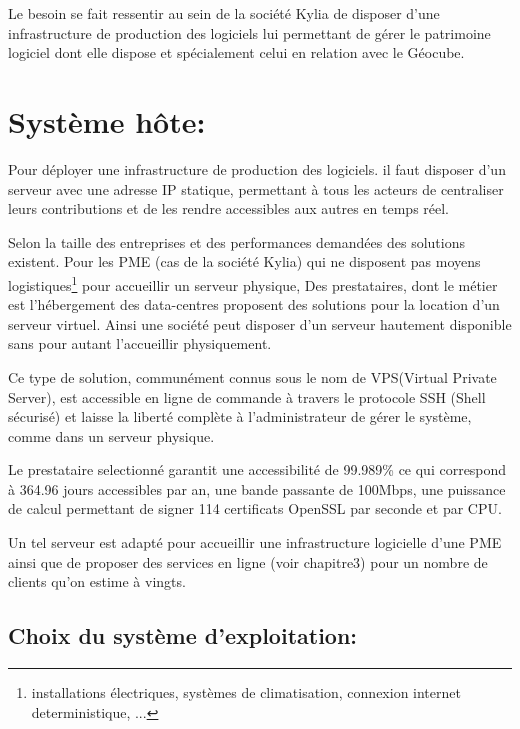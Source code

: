 \documentclass{themeensg}
\begin{document}

Le besoin se fait ressentir au sein de la société Kylia de disposer d'une infrastructure de production des logiciels lui permettant de gérer le patrimoine logiciel dont elle dispose et spécialement celui en relation avec le Géocube.  

\section{Système hôte:}

Pour déployer une infrastructure de production des logiciels. il faut disposer d'un serveur avec une adresse IP statique, permettant à tous les acteurs de centraliser leurs contributions et de les rendre accessibles aux autres en temps réel.

Selon la taille des entreprises et des performances demandées des solutions existent. Pour les PME (cas de la société Kylia) qui ne disposent pas moyens logistiques\footnote{installations électriques, systèmes de climatisation, connexion internet deterministique, ...} pour accueillir un serveur physique, Des prestataires, dont le métier est l'hébergement des data-centres proposent des solutions pour la location d'un serveur virtuel. Ainsi une société peut disposer d'un serveur hautement disponible sans pour autant l'accueillir physiquement.

Ce type de solution, communément connus sous le nom de VPS(Virtual Private Server), est accessible en ligne de commande à travers le protocole SSH (Shell sécurisé) et laisse la liberté complète à l'administrateur de gérer le système, comme dans un serveur physique.

Le prestataire selectionné garantit une accessibilité de 99.989\% ce qui correspond à 364.96 jours accessibles par an, une bande passante de 100Mbps, une puissance de calcul permettant de signer 114 certificats OpenSSL par seconde et par CPU.

Un tel serveur est adapté pour accueillir une infrastructure logicielle d'une PME ainsi que de proposer des services en ligne (voir chapitre3) pour un nombre de clients qu'on estime à vingts.

\subsection{Choix du système d'exploitation:}
\end{document}
